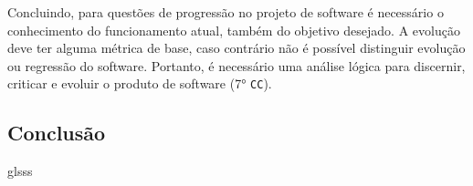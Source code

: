 \begin{itemize}
    Concluindo, para questões de progressão no projeto de software é necessário o conhecimento do funcionamento atual, também do objetivo desejado. A evolução deve ter alguma métrica de base, caso contrário não é possível distinguir evolução ou regressão do software. Portanto, é necessário uma análise lógica para discernir, criticar e evoluir o produto de software (7° \texttt{CC}).
    

\subsection{Conclusão}
glsss
\end{itemize}


